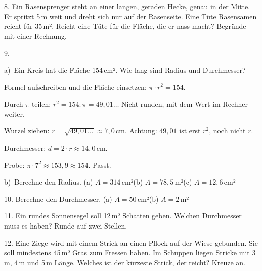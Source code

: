 \documentclass[11pt]{article}
\newcommand{\grau}[1]{{\color{mbgrau}#1}}
\begin{document}
\begin{pfaufg}{}{8.}{}
Ein Rasensprenger steht an einer langen, geraden Hecke, genau in der Mitte. Er spritzt 5\,m weit und dreht sich nur auf der Rasenseite. Eine Tüte Rasensamen reicht für 35\,m². Reicht eine Tüte für die Fläche, die er nass macht? Begründe mit einer Rechnung.
\end{pfaufg}

\begin{pfaufg}{}{9.}{}
\grau{a)\ Ein Kreis hat die Fläche 154\,cm². Wie lang sind Radius und Durchmesser?\par\smallskip Formel aufschreiben und die Fläche einsetzen: $\pi \cdot r^2 = 154$.\par Durch $\pi$ teilen: $r^2 = 154 : \pi = 49{,}01\ldots$ Nicht runden, mit dem Wert im Rechner weiter.\par Wurzel ziehen: $r = \sqrt{49{,}01\ldots} \approx 7{,}0$\,cm. Achtung: $49{,}01$ ist erst $r^2$, noch nicht $r$.\par Durchmesser: $d = 2 \cdot r \approx 14{,}0$\,cm.\par Probe: $\pi \cdot 7^2 \approx 153{,}9 \approx 154$. Passt.}
\par\medskip
b)\ Berechne den Radius. (a) $A = 314$\,cm²\quad (b) $A = 78{,}5$\,m²\quad (c) $A = 12{,}6$\,cm²
\end{pfaufg}

\begin{pfaufg}{}{10.}{}
Berechne den Durchmesser. (a) $A = 50$\,cm²\quad (b) $A = 2$\,m²
\end{pfaufg}

\begin{pfaufg}{}{11.}{}
Ein rundes Sonnensegel soll 12\,m² Schatten geben. Welchen Durchmesser muss es haben? Runde auf zwei Stellen.
\end{pfaufg}

\begin{pfaufg}{}{12.}{}
Eine Ziege wird mit einem Strick an einen Pflock auf der Wiese gebunden. Sie soll mindestens 45\,m² Gras zum Fressen haben. Im Schuppen liegen Stricke mit 3\,m, 4\,m und 5\,m Länge. Welches ist der kürzeste Strick, der reicht? Kreuze an.\par\smallskip {}\par {}
\end{pfaufg}
\end{document}

